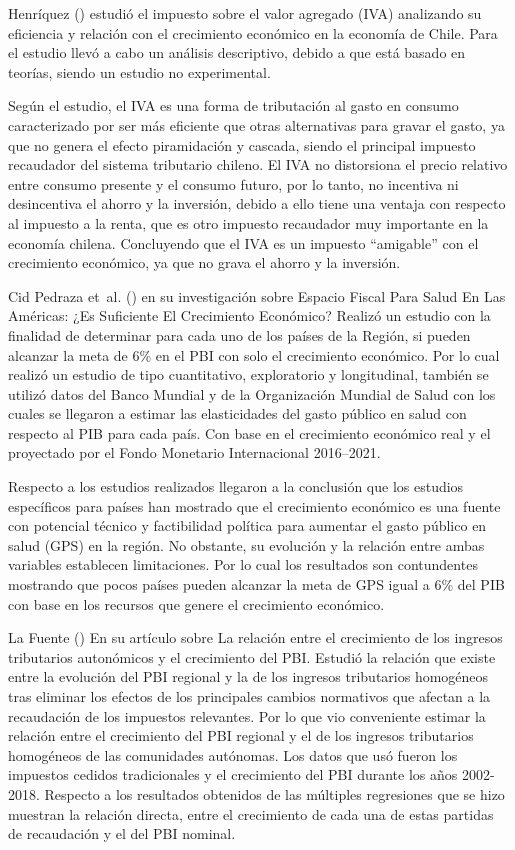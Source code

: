 \documentclass[
  jou,
  floatsintext,
  longtable,
  a4paper,
  nolmodern,
  notxfonts,
  notimes,
  12pt,
  colorlinks=true,linkcolor=blue,citecolor=blue,urlcolor=blue]{apa7}
\begin{document}
Henríquez () estudió el
impuesto sobre el valor agregado (IVA) analizando su eficiencia y
relación con el crecimiento económico en la economía de Chile. Para el
estudio llevó a cabo un análisis descriptivo, debido a que está basado
en teorías, siendo un estudio no experimental.

Según el estudio, el IVA es una forma de tributación al gasto en consumo
caracterizado por ser más eficiente que otras alternativas para gravar
el gasto, ya que no genera el efecto piramidación y cascada, siendo el
principal impuesto recaudador del sistema tributario chileno. El IVA no
distorsiona el precio relativo entre consumo presente y el consumo
futuro, por lo tanto, no incentiva ni desincentiva el ahorro y la
inversión, debido a ello tiene una ventaja con respecto al impuesto a la
renta, que es otro impuesto recaudador muy importante en la economía
chilena. Concluyendo que el IVA es un impuesto ``amigable'' con el
crecimiento económico, ya que no grava el ahorro y la inversión.

Cid Pedraza et~al. () en su
investigación sobre Espacio Fiscal Para Salud En Las Américas: ¿Es
Suficiente El Crecimiento Económico? Realizó un estudio con la finalidad
de determinar para cada uno de los países de la Región, si pueden
alcanzar la meta de 6\% en el PBI con solo el crecimiento económico. Por
lo cual realizó un estudio de tipo cuantitativo, exploratorio y
longitudinal, también se utilizó datos del Banco Mundial y de la
Organización Mundial de Salud con los cuales se llegaron a estimar las
elasticidades del gasto público en salud con respecto al PIB para cada
país. Con base en el crecimiento económico real y el proyectado por el
Fondo Monetario Internacional 2016--2021.

Respecto a los estudios realizados llegaron a la conclusión que los
estudios específicos para países han mostrado que el crecimiento
económico es una fuente con potencial técnico y factibilidad política
para aumentar el gasto público en salud (GPS) en la región. No obstante,
su evolución y la relación entre ambas variables establecen
limitaciones. Por lo cual los resultados son contundentes mostrando que
pocos países pueden alcanzar la meta de GPS igual a 6\% del PIB con base
en los recursos que genere el crecimiento económico.

La Fuente () En su
artículo sobre La relación entre el crecimiento de los ingresos
tributarios autonómicos y el crecimiento del PBI. Estudió la relación
que existe entre la evolución del PBI regional y la de los ingresos
tributarios homogéneos tras eliminar los efectos de los principales
cambios normativos que afectan a la recaudación de los impuestos
relevantes. Por lo que vio conveniente estimar la relación entre el
crecimiento del PBI regional y el de los ingresos tributarios homogéneos
de las comunidades autónomas. Los datos que usó fueron los impuestos
cedidos tradicionales y el crecimiento del PBI durante los años
2002-2018. Respecto a los resultados obtenidos de las múltiples
regresiones que se hizo muestran la relación directa, entre el
crecimiento de cada una de estas partidas de recaudación y el del PBI
nominal.
\end{document}
